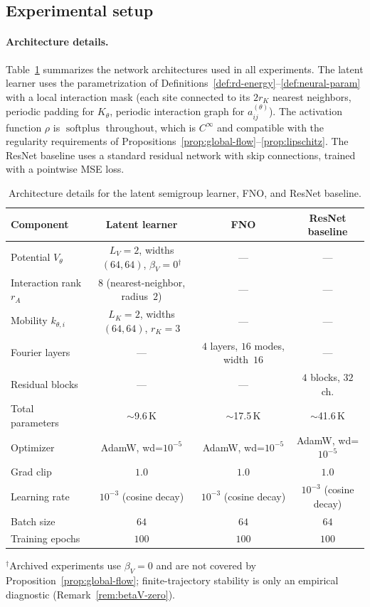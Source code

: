 \documentclass[hidelinks,review,nohypdvips,onefignum,onetabnum]{siamart220329}
\newcommand{\softplus}{\operatorname{softplus}}
\begin{document}
\subsection{Experimental setup}\label{subsec:exp-setup}

\paragraph{Architecture details.}
Table~\ref{tab:architecture} summarizes the network architectures used in all experiments. The latent learner uses the parametrization of Definitions~\ref{def:rd-energy}--\ref{def:neural-param} with a local interaction mask (each site connected to its $2r_K$ nearest neighbors, periodic padding for $K_{\theta}$, periodic interaction graph for $a_{ij}^{(\theta)}$). The activation function $\rho$ is $\softplus$ throughout, which is $C^{\infty}$ and compatible with the regularity requirements of Propositions~\ref{prop:global-flow}--\ref{prop:lipschitz}. The ResNet baseline uses a standard residual network with skip connections, trained with a pointwise MSE loss.

\begin{table}[htbp]
\centering
\caption{Architecture details for the latent semigroup learner, FNO, and ResNet baseline.}
\label{tab:architecture}
\small
\begin{tabular}{@{}lccc@{}}
\hline
Component & Latent learner & FNO & ResNet baseline \\
\hline
Potential $V_{\theta}$ & $L_V{=}2$, widths $(64,64)$, $\beta_V{=}0$${}^{\dagger}$ & --- & --- \\
Interaction rank $r_A$ & $8$ (nearest-neighbor, radius~$2$) & --- & --- \\
Mobility $k_{\theta,i}$ & $L_K{=}2$, widths $(64,64)$, $r_K{=}3$ & --- & --- \\
Fourier layers & --- & $4$ layers, $16$ modes, width~$16$ & --- \\
Residual blocks & --- & --- & $4$ blocks, $32$ ch. \\
Total parameters & $\sim$9.6\,K & $\sim$17.5\,K & $\sim$41.6\,K \\
\hline
Optimizer & AdamW, wd=$10^{-5}$ & AdamW, wd=$10^{-5}$ & AdamW, wd=$10^{-5}$ \\
Grad clip & $1.0$ & $1.0$ & $1.0$ \\
Learning rate & $10^{-3}$ (cosine decay) & $10^{-3}$ (cosine decay) & $10^{-3}$ (cosine decay) \\
Batch size & $64$ & $64$ & $64$ \\
Training epochs & $100$ & $100$ & $100$ \\
\hline
\end{tabular}
\end{table}
${}^{\dagger}$Archived experiments use $\beta_V=0$ and are not covered by Proposition~\ref{prop:global-flow}; finite-trajectory stability is only an empirical diagnostic (Remark~\ref{rem:betaV-zero}).
\end{document}
